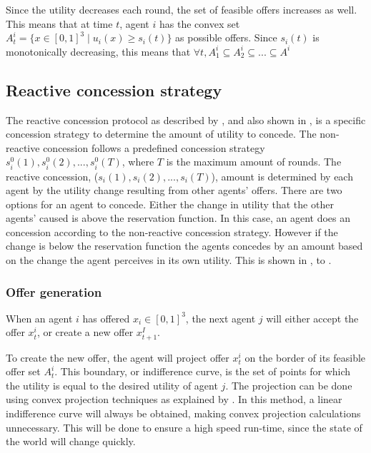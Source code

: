 Since the utility decreases each round, the set of feasible offers increases as well. This means that at time $t$, agent $i$ has the convex set $A^i_t = \{x\in [0,1]^3 \mid u_i(x) \geq s_i(t)   \}$ as possible offers. Since $s_i(t)$ is monotonically decreasing, this means that $\forall t, A^i_1\subseteq A^i_2 \subseteq ... \subseteq A^i$ 

\subsection{Reactive concession strategy}
\label{sec:reactiveconcessionstr}
The reactive concession protocol as described by \citet{zheng2015automated}, and also shown in , is a specific concession strategy to determine the amount of utility to concede. The non-reactive concession follows a predefined concession strategy $s_i^0(1), s_i^0(2),...,s_i^0(T)$, where $T$ is the maximum amount of rounds. The reactive concession, ($s_i(1), s_i(2),..., s_i(T)$), amount is determined by each agent by the utility change resulting from other agents' offers. There are two options for an agent to concede. Either the change in utility that the other agents' caused is above the reservation function. In this case, an agent does an concession according to the non-reactive concession strategy. However if the change is below the reservation function the agents concedes by an amount based on the change the agent perceives in its own utility. This is shown in ,   to .


\subsubsection{Offer generation}
When an agent $i$ has offered $x_i\in[0,1]^3$, the next agent $j$ will either accept the offer $x^i_t$, or create a new offer $x^I_{t+1}$. 

To create the new offer, the agent will project offer $x^i_t$ on the border of its feasible offer set $A^i_t$. This boundary, or indifference curve, is the set of points for which the utility is equal to the desired utility of agent $j$. The projection can be done using convex projection techniques as explained by \citet{boyd2004convex}. In this method, a linear indifference curve will always be obtained, making convex projection calculations unnecessary. This will be done to ensure a high speed run-time, since the state of the world will change quickly.


